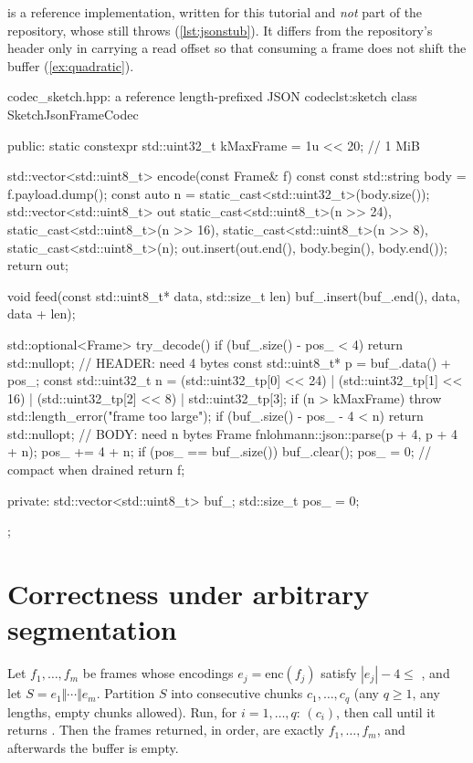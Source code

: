  is a reference implementation, written for this tutorial and \emph{not} part of the repository, whose
 still throws (\cref{lst:jsonstub}). It differs from the repository's header only in carrying a read
offset  so that consuming a frame does not shift the buffer (\cref{ex:quadratic}).

\begin{code}{codec\_sketch.hpp: a reference length-prefixed JSON codec}{lst:sketch}
class SketchJsonFrameCodec {
public:
    static constexpr std::uint32_t kMaxFrame = 1u << 20;  // 1 MiB

    std::vector<std::uint8_t> encode(const Frame& f) const {
        const std::string body = f.payload.dump();
        const auto n = static_cast<std::uint32_t>(body.size());
        std::vector<std::uint8_t> out{
            static_cast<std::uint8_t>(n >> 24), static_cast<std::uint8_t>(n >> 16),
            static_cast<std::uint8_t>(n >> 8),  static_cast<std::uint8_t>(n)};
        out.insert(out.end(), body.begin(), body.end());
        return out;
    }

    void feed(const std::uint8_t* data, std::size_t len) {
        buf_.insert(buf_.end(), data, data + len);
    }

    std::optional<Frame> try_decode() {
        if (buf_.size() - pos_ < 4) return std::nullopt;            // HEADER: need 4 bytes
        const std::uint8_t* p = buf_.data() + pos_;
        const std::uint32_t n = (std::uint32_t{p[0]} << 24) | (std::uint32_t{p[1]} << 16) |
                                (std::uint32_t{p[2]} << 8)  |  std::uint32_t{p[3]};
        if (n > kMaxFrame) throw std::length_error("frame too large");
        if (buf_.size() - pos_ - 4 < n) return std::nullopt;        // BODY: need n bytes
        Frame f{nlohmann::json::parse(p + 4, p + 4 + n)};
        pos_ += 4 + n;
        if (pos_ == buf_.size()) { buf_.clear(); pos_ = 0; }        // compact when drained
        return f;
    }

private:
    std::vector<std::uint8_t> buf_;
    std::size_t pos_ = 0;
};
\end{code}

\section{Correctness under arbitrary segmentation}
\begin{theorem}\label{thm:segmentation}
Let $f_1,\dots,f_m$ be frames whose encodings $e_j=\mathrm{enc}(f_j)$ satisfy $|e_j|-4\le$ , and let
$S=e_1\Vert\cdots\Vert e_m$. Partition $S$ into consecutive chunks $c_1,\dots,c_q$ (any $q\ge1$, any lengths, empty chunks
allowed). Run, for $i=1,\dots,q$: $(c_i)$, then call  until it returns . Then the
frames returned, in order, are exactly $f_1,\dots,f_m$, and afterwards the buffer is empty.
\end{theorem}

